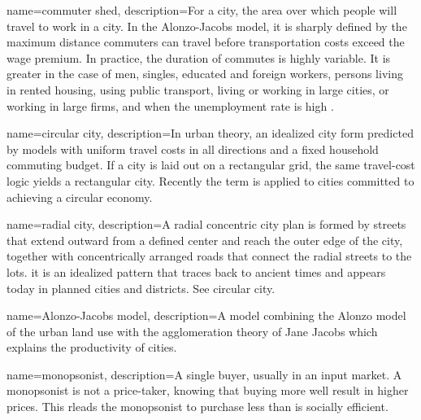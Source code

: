 {
name=commuter shed,
description={For a city, the area over which people will travel to work in a city. In the \gls{Alonzo-Jacobs model}, it is sharply defined by the maximum distance commuters can travel before transportation costs exceed the wage premium. In  practice, the duration of commutes is highly variable. It is greater in the case of men, singles, educated and foreign workers, persons living in rented housing, using public transport, living or working in large cities, or working in large firms,  and when the  unemployment rate is high\cite{axisaFactorsInfluencingCommute2012} .}
}

{
name=circular city,
description={In urban theory, an idealized city form predicted by models with uniform travel costs in all directions and a fixed household commuting budget. If a city is laid out on a rectangular grid, the same travel-cost logic yields a rectangular city. Recently the term is applied to cities committed to achieving a circular economy. }
}

{
name=radial city,
description={A radial concentric city plan is formed by streets that extend outward from a defined center and reach the outer edge of the city, together with concentrically arranged roads that connect the radial streets to the lots. it is an idealized pattern that traces back to ancient times and appears  today in planned cities and districts. See \gls{circular city}.}
}


{
name=Alonzo-Jacobs model,
description={A model combining the \gls{Alonzo model} of the urban land use  \cite{alonsoModelUrbanLand1960} with the \gls{agglomeration} theory of Jane Jacobs \cite{jacobsEconomyCities1969} which explains the productivity of cities.}
}

{
name=monopsonist,
description={A single buyer, usually in an input market. A monopsonist is not a price-taker, knowing that buying more well result in  higher prices. This rleads the monopsonist to purchase less than is socially efficient.}
}

